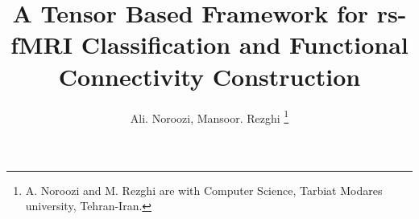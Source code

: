 \documentclass[journal]{IEEEtran}
\begin{document}
	\title{A Tensor Based Framework for rs-fMRI Classification and Functional Connectivity Construction} 
%	
	
	\author{Ali. Noroozi,
		Mansoor. Rezghi%
		\thanks{A. Noroozi and M. Rezghi are with Computer Science, Tarbiat Modares university, Tehran-Iran.}%
	}
	
	
\end{document}
